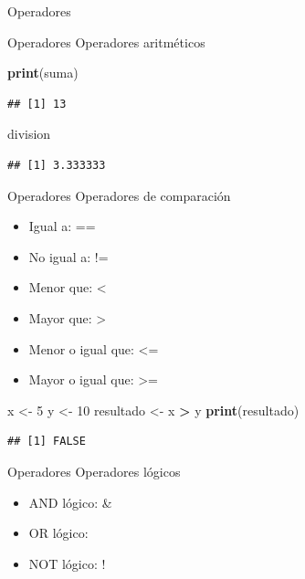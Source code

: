 \documentclass[
  ignorenonframetext,
]{beamer}
\newenvironment{Shaded}{\begin{snugshade}}{\end{snugshade}}
\newcommand{\DecValTok}[1]{\textcolor[rgb]{0.00,0.00,0.81}{#1}}
\newcommand{\FunctionTok}[1]{\textcolor[rgb]{0.13,0.29,0.53}{\textbf{#1}}}
\newcommand{\NormalTok}[1]{#1}
\newcommand{\OtherTok}[1]{\textcolor[rgb]{0.56,0.35,0.01}{#1}}
\newcommand{\SpecialCharTok}[1]{\textcolor[rgb]{0.81,0.36,0.00}{\textbf{#1}}}
\providecommand{\tightlist}{%
  \setlength{\itemsep}{0pt}\setlength{\parskip}{0pt}}
\begin{document}
\begin{frame}[fragile]{Operadores}
\begin{block}{Operadores \textbar{} Operadores aritméticos}
\begin{Shaded}
\begin{Highlighting}[]
\FunctionTok{print}\NormalTok{(suma)}
\end{Highlighting}
\end{Shaded}

\begin{verbatim}
## [1] 13
\end{verbatim}

\begin{Shaded}
\begin{Highlighting}[]
\NormalTok{division}
\end{Highlighting}
\end{Shaded}

\begin{verbatim}
## [1] 3.333333
\end{verbatim}
\end{block}

\begin{block}{Operadores \textbar{} Operadores de comparación}
\protect\hypertarget{operadores-operadores-de-comparaciuxf3n}{}
\begin{itemize}
\tightlist
\item
  Igual a: ==
\item
  No igual a: !=
\item
  Menor que: \textless{}
\item
  Mayor que: \textgreater{}
\item
  Menor o igual que: \textless=
\item
  Mayor o igual que: \textgreater=
\end{itemize}

\begin{Shaded}
\begin{Highlighting}[]
\NormalTok{x }\OtherTok{\textless{}{-}} \DecValTok{5}
\NormalTok{y }\OtherTok{\textless{}{-}} \DecValTok{10}
\NormalTok{resultado }\OtherTok{\textless{}{-}}\NormalTok{ x }\SpecialCharTok{\textgreater{}}\NormalTok{ y}
\FunctionTok{print}\NormalTok{(resultado)}
\end{Highlighting}
\end{Shaded}

\begin{verbatim}
## [1] FALSE
\end{verbatim}
\end{block}

\begin{block}{Operadores \textbar{} Operadores lógicos}
\protect\hypertarget{operadores-operadores-luxf3gicos}{}
\begin{itemize}
\tightlist
\item
  AND lógico: \&
\item
  OR lógico: \textbar{}
\item
  NOT lógico: !
\end{itemize}


\end{block}
\end{frame}
\end{document}

